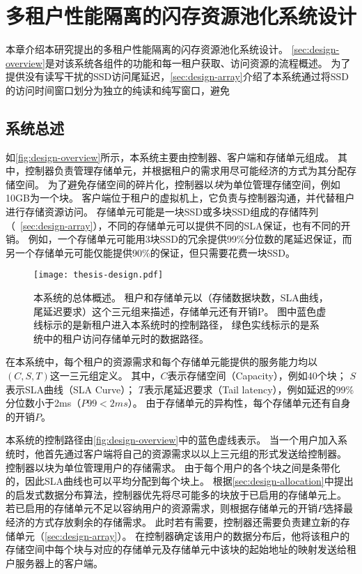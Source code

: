 
\chapter{多租户性能隔离的闪存资源池化系统设计}
\label{chap:design}

本章介绍本研究提出的多租户性能隔离的闪存资源池化系统设计。
\autoref{sec:design-overview}是对该系统各组件的功能和每一租户获取、访问资源的流程概述。
为了提供没有读写干扰的SSD访问尾延迟，\autoref{sec:design-array}介绍了本系统通过将SSD的访问时间窗口划分为独立的纯读和纯写窗口，避免

\section{系统总述}
\label{sec:design-overview}

如\autoref{fig:design-overview}所示，本系统主要由控制器、客户端和存储单元组成。
其中，控制器负责管理存储单元，并根据租户的需求用尽可能经济的方式为其分配存储空间。
为了避免存储空间的碎片化，控制器以\textit{块}为单位管理存储空间，例如10GB为一个块。
客户端位于租户的虚拟机上，它负责与控制器沟通，并代替租户进行存储资源访问。
存储单元可能是一块SSD或多块SSD组成的存储阵列（~\autoref{sec:design-array}），不同的存储单元可以提供不同的SLA保证，也有不同的开销。
例如，一个存储单元可能用3块SSD的冗余提供99\%分位数的尾延迟保证，而另一个存储单元可能仅能提供90\%的保证，但只需要花费一块SSD。

\begin{figure}[h]
  \centering
  \texttt{[image: thesis-design.pdf]}
  \caption{
      本系统的总体概述。
      租户和存储单元以（存储数据块数，SLA曲线，尾延迟要求）这个三元组来描述，存储单元还有开销P。
      图中蓝色虚线标示的是新租户进入本系统时的控制路径，
      绿色实线标示的是系统中的租户访问存储单元时的数据路径。
      }
  \label{fig:design-overview}
\end{figure}

在本系统中，每个租户的资源需求和每个存储单元能提供的服务能力均以$(C, S, T)$这一三元组定义。
其中，$C$表示存储空间（Capacity），例如40个块；
$S$表示SLA曲线（SLA Curve）；
$T$表示尾延迟要求（Tail latency），例如延迟的99\%分位数小于2ms（$P99 < 2ms$）。 
由于存储单元的异构性，每个存储单元还有自身的开销$P$。

本系统的控制路径由\autoref{fig:design-overview}中的蓝色虚线表示。
当一个用户加入系统时，他首先通过客户端将自己的资源需求以以上三元组的形式发送给控制器。
控制器以块为单位管理用户的存储需求。
由于每个用户的各个块之间是条带化的\cite{patterson1988case}，因此SLA曲线也可以平均分配到每个块上。
根据\autoref{sec:design-allocation}中提出的启发式数据分布算法，控制器优先将尽可能多的块放于已启用的存储单元上。
若已启用的存储单元不足以容纳用户的资源需求，则根据存储单元的开销$P$选择最经济的方式存放剩余的存储需求。
此时若有需要，控制器还需要负责建立新的存储单元（\autoref{sec:design-array}）。
在控制器确定该用户的数据分布后，他将该租户的存储空间中每个块与对应的存储单元及存储单元中该块的起始地址的映射发送给租户服务器上的客户端。

